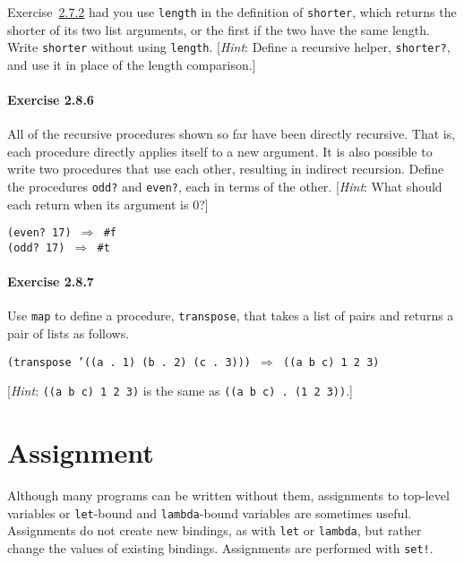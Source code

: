 \label{start_s155}Exercise \hyperref[start_g31]{2.7.2} had you use \texttt{length} in the definition
of \label{start_s156}\texttt{shorter},
which returns the shorter of its two list arguments, or the first
if the two have the same length.
Write \texttt{shorter} without using \texttt{length}.
[\textit{Hint}: Define a recursive helper,
\label{start_s157}\texttt{shorter?}, and use it
in place of the length comparison.]




\paragraph{Exercise \label{start_g38}2.8.6}


\label{start_s158}\label{start_EXEVENODD}All of the recursive procedures shown so far have been directly recursive.
That is, each procedure directly applies itself to a new argument.
It is also possible to write two procedures that use each other, resulting
in indirect recursion.
Define the procedures \label{start_s159}\texttt{odd?} and \label{start_s160}\texttt{even?}, each in terms of the
other.
[\textit{Hint}: What should each return when its argument is 0?]


\begin{alltt}
(even? 17) \(\Rightarrow\) \#{}f
(odd? 17) \(\Rightarrow\) \#{}t
\end{alltt}




\paragraph{Exercise \label{start_g39}2.8.7}


\label{start_s161}Use \label{start_s162}\texttt{map} to define a procedure, \texttt{transpose}, that takes a list
of pairs and returns a pair of lists as follows.


\texttt{(transpose '((a . 1) (b . 2) (c . 3))) \(\Rightarrow\) ((a b c) 1 2 3)}

[\textit{Hint}: \texttt{((a b c) 1 2 3)} is the same as
\texttt{((a b c) . (1 2 3))}.]




\section{\label{start_g40}\label{start_h9}Assignment\label{start_SECTGSASSIGNMENT}}



Although many programs can be written without them, \label{start_s163}assignments to top-level
\label{start_s164}variables or \texttt{let}-bound and \texttt{lambda}-bound variables are sometimes useful.
Assignments do not create new bindings, as with \texttt{let} or
\texttt{lambda}, but rather change the values of existing bindings.
Assignments are performed with \label{start_s165}\texttt{set!}.


